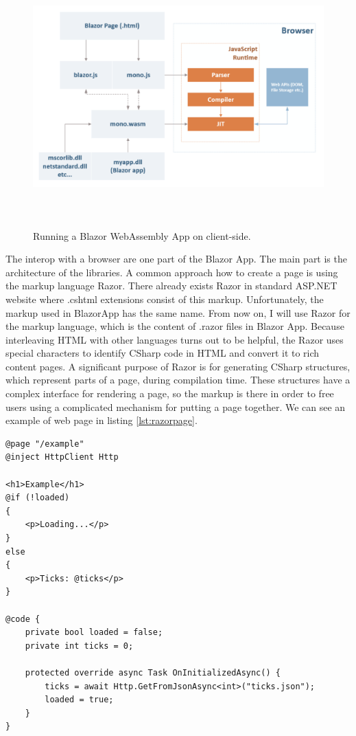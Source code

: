 \begin{figure}[H]\centering
\includegraphics[width=140mm, height=100mm]{./img/BlazorExecution}
\caption{Running a Blazor WebAssembly App on client-side.}
\label{img01:wasm}
\end{figure}

The interop with a browser are one part of the Blazor App.
The main part is the architecture of the libraries.
A common approach how to create a page is using the markup language Razor.
There already exists Razor in standard ASP.NET website where .cshtml extensions consist of this markup.
Unfortunately, the markup used in BlazorApp has the same name.
From now on, I will use Razor for the markup language, which is the content of .razor files in Blazor App.
Because interleaving HTML with other languages turns out to be helpful, the Razor uses special characters to identify CSharp code in HTML and convert it to rich content pages.
A significant purpose of Razor is for generating CSharp structures, which represent parts of a page, during compilation time.
These structures have a complex interface for rendering a page, so the markup is there in order to free users using a complicated mechanism for putting a page together. 
We can see an example of web page in listing \ref{lst:razorpage}.

\begin{lstlisting}[basicstyle=\small, caption=Example of Razor page., label={lst:razorpage}]
@page "/example"
@inject HttpClient Http

<h1>Example</h1>
@if (!loaded)
{
    <p>Loading...</p>
}
else
{
    <p>Ticks: @ticks</p>
}

@code {
    private bool loaded = false;
    private int ticks = 0;

    protected override async Task OnInitializedAsync() {
        ticks = await Http.GetFromJsonAsync<int>("ticks.json");
        loaded = true;
    }
}
\end{lstlisting}

